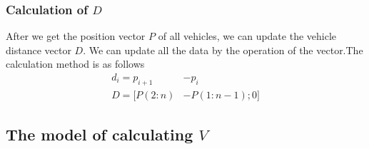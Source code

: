 \documentclass{mcmthesis}
\begin{document}
\subsubsection{Calculation of $D$}
After we get the position vector $P$ of all vehicles, we can update the vehicle distance vector $D$. We can update all the data by the operation of the vector.The calculation method is as follows
\begin{equation}
\begin{split}
	d_i=p_{i+1}&-p_{i}\\
	D=[P(2:n)&-P(1:n-1);0]
\end{split}
\end{equation}

\subsection{The model of calculating $V$}
\label{velocity change}
\end{document}
